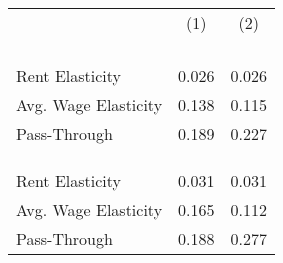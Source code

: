 {
\def\sym#1{\ifmmode^{#1}\else\(^{#1}\)\fi}
\begin{tabular}{l*{2}{c}}
\hline\hline
            &&\\
            &&\\

\vspace{-2mm}&            &            \\
\textit{}&            &            \\
\hline      &            &            \\
Rent Elasticity&       0.026&       0.026\\
Avg. Wage Elasticity&       0.138&       0.115\\
Pass-Through&       0.189&       0.227\\
\vspace{1mm}&            &            \\
\textit{}&            &            \\
\hline      &            &            \\
Rent Elasticity&       0.031&       0.031\\
Avg. Wage Elasticity&       0.165&       0.112\\
Pass-Through&       0.188&       0.277\\
\hline\hline
\end{tabular}
}
